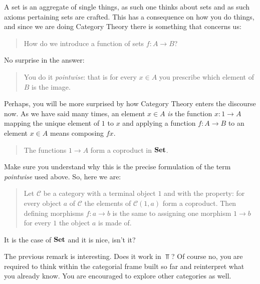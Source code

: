 \begin{example}
  A set is an aggregate of single things, as such one thinks about sets
  and as such axioms pertaining sets are crafted. This has a consequence
  on how you do things, and since we are doing Category Theory there is
  something that concerns us:
%
  \begin{quotation}
    How do we introduce a function of sets \(f : A \to B\)?
  \end{quotation}
%
  No surprise in the answer:
%
  \begin{quotation}
    You do it {\em pointwise}: that is for every \(x \in A\) you prescribe
    which element of \(B\) is the image.
  \end{quotation}
%
  Perhaps, you will be more surprised by how Category Theory enters the
  discourse now. As we have said many times, an element \(x \in A\) {\em
    is} the function \(x : 1 \to A\) mapping the unique element of \(1\)
  to \(x\) and applying a function \(f : A \to B\) to an element
  \(x \in A\) means composing \(f x\).
  \begin{quotation}
    The functions \(1 \to A\) form a coproduct in
    \(\mathbf{Set}\). %
  \end{quotation}
%
  Make sure you understand why this is the precise formulation of the
  term {\em pointwise} used above. So, here we are:
%
  \begin{quotation}
    Let \(\mathcal{C}\) be a category with a terminal object \(1\) and with
    the property: for every object \(a\) of \(\mathcal{C}\) the elements of
    \(\mathcal{C} (1, a)\) form a coproduct. Then defining morphisms
    \(f : a \to b\) is the same to assigning one morphism \(1 \to b\) for
    every \(1\) the object \(a\) is made of.
  \end{quotation}
  It is the case of \(\mathbf{Set}\) and it is nice, isn't it?
\end{example}

\begin{exercise}
  The previous remark is interesting. Does it work in \(\Top\)? Of
  course no, you are required to think within the categorial frame built
  so far and reinterpret what you already know. You are encouraged to
  explore other categories as well.
\end{exercise}

